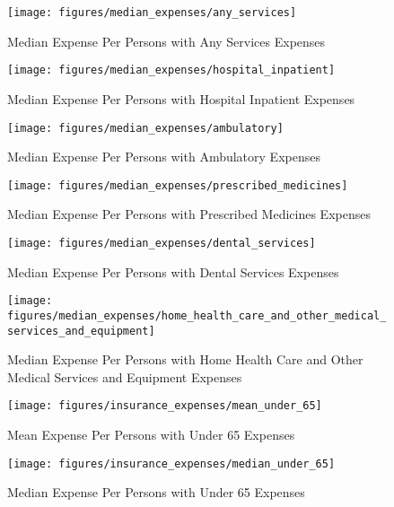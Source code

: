 \documentclass{ucetd}
\begin{document}
\begin{figure}[!ht]
\centering
\texttt{[image: figures/median\_expenses/any\_services]}
\caption{Median Expense Per Persons with Any Services Expenses}
\label{fig:median_expenses_any_services}
\end{figure}

\begin{figure}[!ht]
\centering
\texttt{[image: figures/median\_expenses/hospital\_inpatient]}
\caption{Median Expense Per Persons with Hospital Inpatient Expenses}
\label{fig:median_expenses_hospital_inpatient}
\end{figure}

\begin{figure}[!ht]
\centering
\texttt{[image: figures/median\_expenses/ambulatory]}
\caption{Median Expense Per Persons with Ambulatory Expenses}
\label{fig:median_expenses_ambulatory}
\end{figure}

\begin{figure}[!ht]
\centering
\texttt{[image: figures/median\_expenses/prescribed\_medicines]}
\caption{Median Expense Per Persons with Prescribed Medicines Expenses}
\label{fig:median_expenses_prescribed_medicines}
\end{figure}

\begin{figure}[!ht]
\centering
\texttt{[image: figures/median\_expenses/dental\_services]}
\caption{Median Expense Per Persons with Dental Services Expenses}
\label{fig:median_expenses_dental_services}
\end{figure}

\begin{figure}[!ht]
\centering
\texttt{[image: figures/median\_expenses/home\_health\_care\_and\_other\_medical\_services\_and\_equipment]}
\caption{Median Expense Per Persons with Home Health Care and Other Medical Services and Equipment Expenses}
\label{fig:median_expenses_home_health_care_and_other_medical_services_and_equipment}
\end{figure}

\begin{figure}[!ht]
\centering
\texttt{[image: figures/insurance\_expenses/mean\_under\_65]}
\caption{Mean Expense Per Persons with Under 65 Expenses}
\label{fig:insurance_expenses_mean_under_65}
\end{figure}

\begin{figure}[!ht]
\centering
\texttt{[image: figures/insurance\_expenses/median\_under\_65]}
\caption{Median Expense Per Persons with Under 65 Expenses}
\label{fig:insurance_expenses_median_under_65}
\end{figure}
\end{document}
